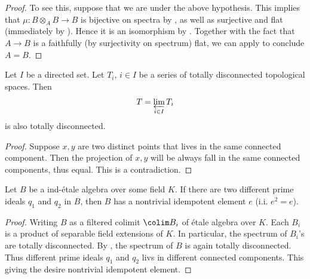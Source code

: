 \begin{proof}
    To see this, suppose that we are under the above hypothesis.
    This implies that $\mu : B \otimes_A B \to B$ is bijective on spectra by
    ,
    as well as surjective and flat (immediately by ).
    Hence it is an isomorphism by . Together with
    the fact that $A \to B$ is a faithfully (by surjectivity on spectrum) flat, we can apply
     to conclude $A = B$.
\end{proof}

\begin{lemma}
    \label{lem:totally-disconnected-inverse-limit}
    Let $I$ be a directed set. Let $T_i, \, i \in I$ be a series of totally disconnected
    topological spaces. Then
    $$T = \varprojlim_{i \in I} T_i $$ is also totally disconnected.
    \leanok
\end{lemma}

\begin{proof}
    \leanok
    Suppose $x, y$ are two distinct points that lives in the same connected component. Then the
    projection of $x, y$ will be always fall in the same connected components, thus equal. This
    is a contradiction.
\end{proof}

\begin{lemma}
    \label{lem:idempotent-in-ind-etale-of-primes}
    Let $B$ be a ind-\'etale algebra over some field $K$. If there are
    two different prime ideals $q_1$ and $q_2$ in $B$, then $B$ has a nontrivial
    idempotent element $e$ (i.i. $e^2 = e$).
    \leanok
\end{lemma}

\begin{proof}
    Writing $B$ as a filtered colimit $\colim B_i$ of \'etale algebra over $K$. Each $B_i$ is a
    product of separable field extensions of $K$. In particular, the spectrum of $B_i$'s are totally
    disconnected. By , the spectrum of $B$ is again
    totally disconnected. Thus different prime ideals $q_1$ and $q_2$ livs in
    different connected components. This giving the desire nontrivial idempotent element.
\end{proof}

